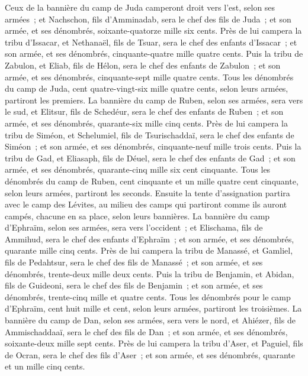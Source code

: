 \begin{multicols}{2}
Ceux de la bannière du camp de Juda camperont droit vers l'est, selon ses armées~; et Nachschon, fils d'Amminadab, sera le chef des fils de Juda~;
et son armée, et ses dénombrés, soixante-quatorze mille six cents.
Près de lui campera la tribu d'Issacar, et Nethanaël, fils de Tsuar, sera le chef des enfants d'Issacar~;
et son armée, et ses dénombrés, cinquante-quatre mille quatre cents.
Puis la tribu de Zabulon, et Eliab, fils de Hélon, sera le chef des enfants de Zabulon~;
et son armée, et ses dénombrés, cinquante-sept mille quatre cents.
Tous les dénombrés du camp de Juda, cent quatre-vingt-six mille quatre cents, selon leurs armées, partiront les premiers.
La bannière du camp de Ruben, selon ses armées, sera vers le sud, et Elitsur, fils de Schedéur, sera le chef des enfants de Ruben~;
et son armée, et ses dénombrés, quarante-six mille cinq cents.
Près de lui campera la tribu de Siméon, et Schelumiel, fils de Tsurischaddaï, sera le chef des enfants de Siméon~;
et son armée, et ses dénombrés, cinquante-neuf mille trois cents.
Puis la tribu de Gad, et Eliasaph, fils de Déuel, sera le chef des enfants de Gad~;
et son armée, et ses dénombrés, quarante-cinq mille six cent cinquante.
Tous les dénombrés du camp de Ruben, cent cinquante et un mille quatre cent cinquante, selon leurs armées, partiront les seconds.
Ensuite la tente d'assignation partira avec le camp des Lévites, au milieu des camps qui partiront comme ils auront campés, chacune en sa place, selon leurs bannières.
La bannière du camp d'Ephraïm, selon ses armées, sera vers l'occident~; et Elischama, fils de Ammihud, sera le chef des enfants d'Ephraïm~;
et son armée, et ses dénombrés, quarante mille cinq cents.
Près de lui campera la tribu de Manassé, et Gamliel, fils de Pedahtsur, sera le chef des fils de Manassé~;
et son armée, et ses dénombrés, trente-deux mille deux cents.
Puis la tribu de Benjamin, et Abidan, fils de Guideoni, sera le chef des fils de Benjamin~;
et son armée, et ses dénombrés, trente-cinq mille et quatre cents.
Tous les dénombrés pour le camp d'Ephraïm, cent huit mille et cent, selon leurs armées, partiront les troisièmes.
La bannière du camp de Dan, selon ses armées, sera vers le nord, et Ahiézer, fils de Ammischaddaaï, sera le chef des fils de Dan~;
et son armée, et ses dénombrés, soixante-deux mille sept cents.
Près de lui campera la tribu d'Aser, et Paguiel, fils de Ocran, sera le chef des fils d'Aser~;
et son armée, et ses dénombrés, quarante et un mille cinq cents.

\end{multicols}
